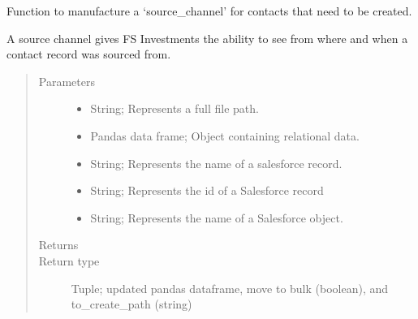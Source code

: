 \documentclass[letterpaper,10pt,english]{sphinxmanual}
\begin{document}
\begin{fulllineitems}
\label{\detokenize{index:ListManagement.sources.campaigns.make_sc}}
Function to manufacture a ‘source\_channel’ for contacts
that need to be created.

A source channel gives FS Investments the ability to see
from where and when a contact record was sourced from.
\begin{quote}\begin{description}
\item[{Parameters}] \leavevmode\begin{itemize}
\item {} 
 \textendash{} String; Represents a full file path.

\item {} 
 \textendash{} Pandas data frame; Object containing relational data.

\item {} 
 \textendash{} String; Represents the name of a salesforce record.

\item {} 
 \textendash{} String; Represents the id of a Salesforce record

\item {} 
 \textendash{} String; Represents the name of a Salesforce object.

\end{itemize}

\item[{Returns}] \leavevmode


\item[{Return type}] \leavevmode
Tuple; updated pandas dataframe, move to bulk (boolean), and to\_create\_path (string)

\end{description}\end{quote}

\end{fulllineitems}

\end{document}
